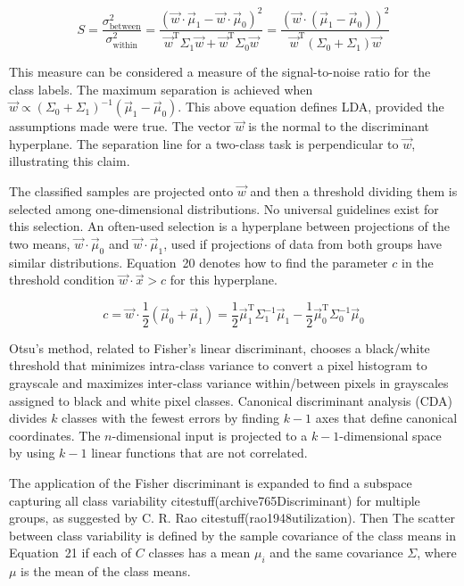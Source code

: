 \documentclass[preprint,12pt]{elsarticle}
\begin{document}
\begin{equation}
	S={\frac{\sigma_{\text{between}}^{2}}{\sigma_{\text{within}}^{2}}}={\frac{({\vec{w}}\cdot{\vec{\mu}}_{1}-{\vec{w}}\cdot {\vec{\mu}}_{0})^{2}}{{\vec{w}}^{\mathrm{T}}\Sigma_{1}{\vec{w}}+{\vec{w}}^{\mathrm{T}}\Sigma_{0}{\vec{w}}}}={\frac{({\vec{w}}\cdot ({\vec{\mu}}_{1}-{\vec{\mu}}_{0}))^{2}}{{\vec{w}}^{\mathrm{T}}(\Sigma_{0}+\Sigma_{1}){\vec{w}}}}
	\label{eqn:19}
\end{equation}

This measure can be considered a measure of the signal-to-noise ratio for the class labels. The maximum separation is achieved when ${\vec{w}}\propto\left(\Sigma_{0}+\Sigma_{1}\right)^{-1}\left({\vec{\mu}}_{1}-{\vec{\mu}}_{0}\right)$. This above equation defines LDA, provided the assumptions made were true.
The vector  $\vec{w}$ is the normal to the discriminant hyperplane. The separation line for a two-class task is perpendicular to $\vec{w}$, illustrating this claim.

The classified samples are projected onto $\vec{w}$ and then a threshold dividing them is selected among one-dimensional distributions. No universal guidelines exist for this selection. An often-used selection is a hyperplane between projections of the two means, ${\vec{w}}\cdot {\vec{\mu}}_{0}$ and $ \vec{w} \cdot {\vec{\mu}}_{1}$, used if projections of data from both groups have similar distributions. 
Equation~20 denotes how to find the parameter $c$ in the threshold condition ${\vec{w}}\cdot {\vec{x}} > c$ for this hyperplane.

\begin{equation}
	c={\vec{w}}\cdot {\frac{1}{2}}({\vec{\mu}}_{0}+{\vec{\mu}}_{1})={\frac{1}{2}}{\vec{\mu}}_{1}^{\mathrm{T}}\Sigma_{1}^{-1}{\vec{\mu}}_{1}-{\frac{1}{2}}{\vec{\mu}}_{0}^{\mathrm{T}}\Sigma_{0}^{-1}{\vec{\mu}}_{0}
	\label{eqn:20}
\end{equation}

Otsu's method, related to Fisher's linear discriminant, chooses a black/white threshold that minimizes intra-class variance to convert a pixel histogram to grayscale and maximizes inter-class variance within/between pixels in grayscales assigned to black and white pixel classes. Canonical discriminant analysis (CDA) divides $k$ classes with the fewest errors by finding $k - 1$ axes that define canonical coordinates. The $n$-dimensional input is projected to a $k - 1$-dimensional space by using $k - 1$ linear functions that are not correlated.

The application of the Fisher discriminant is expanded to find a subspace capturing all class variability citestuff(archive765Discriminant) for multiple groups, as suggested by C. R. Rao citestuff(rao1948utilization). Then The scatter between class variability is defined by the sample covariance of the class means in Equation~21 if each of $C$ classes has a mean $\mu_{i}$ and the same covariance  $\Sigma$, where $\mu$ is the mean of the class means.
\end{document}
